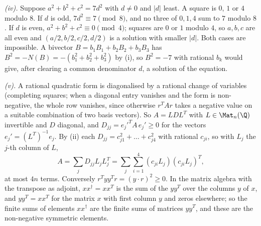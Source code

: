 \emph{(iv).} Suppose $a^{2} + b^{2} + c^{2} = 7d^{2}$ with $d \ne 0$ and $|d|$ least. A square is $0$, $1$ or $4$ modulo $8$. If $d$ is odd, $7d^{2} \equiv 7 \pmod 8$, and no three of $0, 1, 4$ sum to $7$ modulo $8$. If $d$ is even, $a^{2} + b^{2} + c^{2} \equiv 0 \pmod 4$; squares are $0$ or $1$ modulo $4$, so $a, b, c$ are all even and $(a/2, b/2, c/2, d/2)$ is a solution with smaller $|d|$. Both cases are impossible. A bivector $B = b_{1}B_{1} + b_{2}B_{2} + b_{3}B_{3}$ has $B^{2} = -N(B) = -(b_{1}^{2} + b_{2}^{2} + b_{3}^{2})$ by (i), so $B^{2} = -7$ with rational $b_{k}$ would give, after clearing a common denominator $d$, a solution of the equation.

\emph{(v).} A rational quadratic form is diagonalised by a rational change of variables (completing squares; when a diagonal entry vanishes and the form is non-negative, the whole row vanishes, since otherwise $r^{T}Ar$ takes a negative value on a suitable combination of two basis vectors). So $A = LDL^{T}$ with $L \in \Mat_{n}(\Q)$ invertible and $D$ diagonal, and $D_{jj} = e_{j}'^{T}A\,e_{j}' \ge 0$ for the vectors $e_{j}' = (L^{T})^{-1}e_{j}$. By (ii) each $D_{jj} = c_{j1}^{2} + \dots + c_{j4}^{2}$ with rational $c_{ji}$, so with $L_{j}$ the $j$-th column of $L$,
\[
A = \sum_{j}D_{jj}L_{j}L_{j}^{T} = \sum_{j}\sum_{i=1}^{4}(c_{ji}L_{j})(c_{ji}L_{j})^{T},
\]
at most $4n$ terms. Conversely $r^{T}yy^{T}r = (y \cdot r)^{2} \ge 0$. In the matrix algebra with the transpose as adjoint, $xx^{\dagger} = xx^{T}$ is the sum of the $y y^{T}$ over the columns $y$ of $x$, and $yy^{T} = xx^{T}$ for the matrix $x$ with first column $y$ and zeros elsewhere; so the finite sums of elements $xx^{\dagger}$ are the finite sums of matrices $yy^{T}$, and these are the non-negative symmetric elements.

